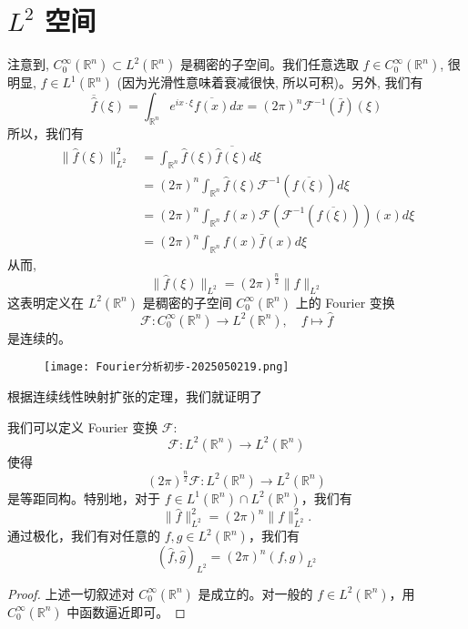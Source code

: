 \section{\texorpdfstring{$L^2$}{L^2} 空间}

注意到, $C_0^{\infty}\left(\mathbb{R}^n\right) \subset L^2\left(\mathbb{R}^n\right)$ 是稠密的子空间。我们任意选取 $f \in C_0^{\infty}\left(\mathbb{R}^n\right)$, 很明显, $\widehat{f} \in L^1\left(\mathbb{R}^n\right)$ (因为光滑性意味着衰减很快, 所以可积)。另外, 我们有
\[
\overline{\widehat{f}}(\xi)=\int_{\mathbb{R}^n} e^{i x \cdot \xi} \overline{f(x)} d x=(2 \pi)^n \mathcal{F}^{-1}(\bar{f})(\xi)
\]
所以，我们有
\[
\begin{aligned}
\|\widehat{f}(\xi)\|_{L^2}^2 & =\int_{\mathbb{R}^n} \widehat{f}(\xi) \overline{\widehat{f}(\xi)} d \xi \\
& =(2 \pi)^n \int_{\mathbb{R}^n} \widehat{f}(\xi) \mathcal{F}^{-1}(\overline{f(\xi)}) d \xi \\
& =(2 \pi)^n \int_{\mathbb{R}^n} f(x) \mathcal{F}\left(\mathcal{F}^{-1}(\overline{f(\xi)})\right)(x) d \xi \\
& =(2 \pi)^n \int_{\mathbb{R}^n} f(x) \bar{f}(x) d \xi
\end{aligned}
\]
从而,
\[
\|\widehat{f}(\xi)\|_{L^2}=(2 \pi)^{\frac{n}{2}}\|f\|_{L^2}
\]
这表明定义在 $L^2\left(\mathbb{R}^n\right)$ 是稠密的子空间 $C_0^{\infty}\left(\mathbb{R}^n\right)$ 上的 Fourier 变换
\[
\mathcal{F}: C_0^{\infty}\left(\mathbb{R}^n\right) \rightarrow L^2\left(\mathbb{R}^n\right), \quad f \mapsto \widehat{f}
\]
是连续的。
\begin{figure}[H]
\centering
\texttt{[image: Fourier分析初步-2025050219.png]}
\label{}
\end{figure}
根据连续线性映射扩张的定理，我们就证明了

\begin{theorem}
我们可以定义 Fourier 变换 $\mathcal{F}$:
\[
\mathcal{F}: L^2\left(\mathbb{R}^n\right) \rightarrow L^2\left(\mathbb{R}^n\right)
\]使得
\[
(2 \pi)^{\frac{n}{2}} \mathcal{F}: L^2\left(\mathbb{R}^n\right) \longrightarrow L^2\left(\mathbb{R}^n\right)
\]是等距同构。特别地，对于 $f \in L^1\left(\mathbb{R}^n\right) \cap L^2\left(\mathbb{R}^n\right)$，我们有
\[
\|\widehat{f}\|_{L^2}^2=(2 \pi)^n\|f\|_{L^2}^2 .
\]通过极化，我们有对任意的 $f, g \in L^2\left(\mathbb{R}^n\right)$，我们有
\[
(\widehat{f}, \widehat{g})_{L^2}=(2 \pi)^n(f, g)_{L^2}
\]
\end{theorem}
\begin{proof}
上述一切叙述对 $C_0^{\infty}\left(\mathbb{R}^n\right)$ 是成立的。对一般的 $f \in L^2\left(\mathbb{R}^n\right)$，用 $C_0^{\infty}\left(\mathbb{R}^n\right)$ 中函数逼近即可。
\end{proof}

